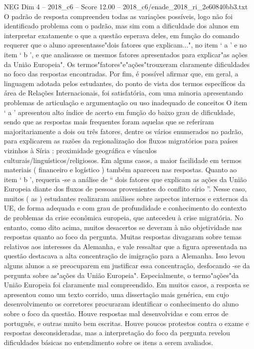 \begin{textsample}{NEG Dim 4 – 2018\_c6 – Score 12.00 – 2018\_c6/enade\_2018\_ri\_2e60840bb3.txt}
O padrão de resposta compreendeu todas as variações possíveis, logo não foi identificado problema com o padrão, mas sim com a dificuldade dos alunos em interpretar exatamente o que a questão esperava deles, em função do comando requerer que o aluno apresentasse"dois fatores que explicam...", no item ‘ a ’ e no item ‘ b ’, e que analisasse os mesmos fatores apresentados para explicar"as ações da União Europeia".
Os termos"fatores"e"ações"trouxeram claramente dificuldades no foco das respostas encontradas.
Por fim, é possível afirmar que, em geral, a linguagem adotada pelos estudantes, do ponto de vista dos termos específicos da área de Relações Internacionais, foi satisfatória, com uma minoria apresentando problemas de articulação e argumentação ou uso inadequado de conceitos O item ‘ a ’ apresentou alto índice de acerto em função do baixo grau de dificuldade, sendo que as respostas mais frequentes foram aquelas que se referiram majoritariamente a dois ou três fatores, dentre os vários enumerados no padrão, para explicarem as razões da regionalização dos fluxos migratórios para países vizinhos à Síria : proximidade geográfica e vínculos culturais/linguísticos/religiosos.
Em alguns casos, a maior facilidade em termos materiais ( financeiro e logístico ) também apareceu nas respostas.
Quanto ao item ‘ b ’, requeria -se a análise de “ dois fatores que explicam as ações da União Europeia diante dos fluxos de pessoas provenientes do conflito sírio ”.
Nesse caso, muitos ( as ) estudantes realizaram análises sobre aspectos internos e externos da UE, de forma adequada e com grau de profundidade e conhecimento do contexto de problemas da crise econômica europeia, que antecedeu à crise migratória.
No entanto, como dito acima, muitos desacertos se deveram à não objetividade nas respostas quanto ao foco da pergunta.
Muitas respostas divagaram sobre temas relativos aos interesses da Alemanha, e vale ressaltar que a figura apresentada na questão destacava a alta concentração de imigração para a Alemanha.
Isso levou alguns alunos a se preocuparem em justificar essa concentração, desfocando -se da pergunta sobre as"ações da União Europeia".
Especialmente, o termo"ações"da União Europeia foi claramente mal compreendido.
Em muitos casos, a resposta se apresentou como um texto corrido, uma dissertação mais genérica, em cujo desenvolvimento os corretores procuraram identificar o conhecimento do aluno sobre o foco da questão.
Houve respostas mal desenvolvidas e com erros de português, e outras muito bem escritas.
Houve poucos protestos contra o exame e respostas desconsideradas, mas a interpretação do foco da pergunta revelou dificuldades básicas no entendimento sobre os itens a serem avaliados.

\end{textsample}
